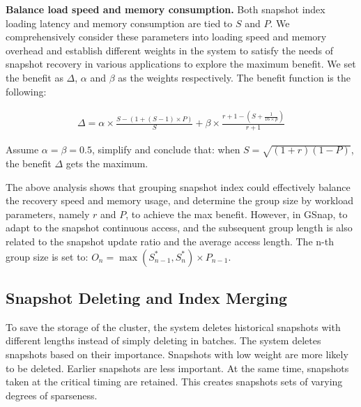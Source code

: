 \documentclass[sigconf, nonacm]{acmart}
\begin{document}
\textbf{Balance load speed and memory consumption.} Both snapshot index loading latency and memory consumption are tied to $S$ and $P$. We comprehensively consider these parameters into loading speed and memory overhead and establish different weights in the system to satisfy the needs of snapshot recovery in various applications to explore the maximum benefit. We set the benefit as $\Delta$, $\alpha$ and $\beta$ as the weights respectively. The benefit function is the following:

\vspace{-0.2cm}
\begin{small}
	\begin{equation}
		\begin{split}
			\Delta = \alpha \times \frac{S-(1+(S-1)\times P)}{S}+\beta\times\frac{r+1-(S+\frac{1}{16\times p})}{r+1} 
		\end{split}
	\end{equation}
\end{small}
Assume $\alpha=\beta=0.5$, simplify and conclude that: when $S=\sqrt{(1+r)(1-P)}$, the benefit $\Delta$ gets the maximum.

The above analysis shows that grouping snapshot index could effectively balance the recovery speed and memory usage, and determine the group size by workload parameters, namely $r$ and $P$, to achieve the max benefit.
However, in GSnap, to adapt to the snapshot continuous access, and the subsequent group length is also related to the snapshot update ratio and the average access length.
The n-th group size is set to: $O_n=\max(S_{n-1}^\ast, S_n^\ast) \times P_{n-1}$.

\subsection{Snapshot Deleting and Index Merging}
To save the storage of the cluster, the system deletes historical snapshots with different lengths instead of simply deleting in batches. The system deletes snapshots based on their importance. Snapshots with low weight are more likely to be deleted. Earlier snapshots are less important. At the same time, snapshots taken at the critical timing are retained. This creates snapshots sets of varying degrees of sparseness.
\end{document}
